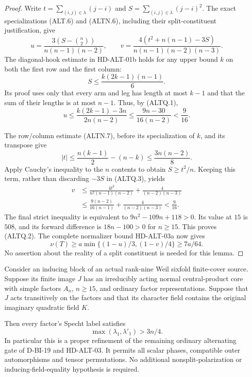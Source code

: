 \begin{proof}
Write $t=\sum_{(i,j)\in\lambda}(j-i)$ and
$S=\sum_{(i,j)\in\lambda}(j-i)^2$. The exact specializations
(ALT.6) and (ALTN.6), including their split-constituent justification,
give
\[
 u=\frac{3(S-\binom n2)}{n(n-1)(n-2)},\qquad
 v=\frac{4(t^2+n(n-1)-3S)}{n(n-1)(n-2)(n-3)}.
                                                               \tag{ALTQ.3}
\]
The diagonal-hook estimate in HD-ALT-01b holds for any upper
bound $k$ on both the first row and the first column:
\[
 S\le\frac{k(2k-1)(n-1)}6.
\]
Its proof uses only that every arm and leg has length at most
$k-1$ and that the sum of their lengths is at most $n-1$.
Thus, by (ALTQ.1),
\[
 u\le\frac{k(2k-1)-3n}{2n(n-2)}
    \le\frac{9n-30}{16(n-2)}<\frac9{16}.
                                                               \tag{ALTQ.4}
\]

The row/column estimate (ALTN.7), before its specialization of $k$,
and its transpose give
\[
 |t|\le\frac{n(k-1)}2-(n-k)
       \le\frac{3n(n-2)}8.
                                                               \tag{ALTQ.5}
\]
Apply Cauchy's inequality to the $n$ contents to obtain $S\ge t^2/n$.
Keeping this term, rather than discarding $-3S$ in (ALTQ.3), yields
\[
 \begin{split}
 v&\le\frac{4t^2}{n^2(n-1)(n-2)}
              +\frac4{(n-2)(n-3)}\\
  &\le\frac{9(n-2)}{16(n-1)}
              +\frac4{(n-2)(n-3)}<\frac9{16}.
 \end{split}                                                   \tag{ALTQ.6}
\]
The final strict inequality is equivalent to
$9n^2-109n+118>0$. Its value at $15$ is $508$,
and its forward difference is $18n-100>0$ for $n\ge15$.
This proves (ALTQ.2). The complete normalizer bound HD-ALT-03a
now gives
\[
 \nu(T)\ge a\min\{(1-u)/3,(1-v)/4\}\ge7a/64.
\]
No assertion about the reality of a split constituent is needed
for this lemma.
\end{proof}

\begin{theorem}
\label{HD-ALT-04b}
Consider an inducing block of an actual rank-nine Weil sixfold
finite-cover source. Suppose its finite image $J$ has an irreducibly
acting normal central-product core with simple factors $A_n$,
$n\ge15$, and ordinary factor representations. Suppose that $J$
acts transitively on the factors and that its character field
contains the original imaginary quadratic field $K$.

Then every factor's Specht label satisfies
\[
                   \max(\lambda_1,\lambda'_1)>3n/4.
                                                               \tag{ALTQ.7}
\]
In particular this is a proper refinement of the remaining
ordinary alternating gate of D-BI-19 and HD-ALT-03.
It permits all scalar phases, compatible outer automorphisms
and tensor permutations. No additional nonsplit-polarization
or inducing-field-equality hypothesis is required.
\end{theorem}

